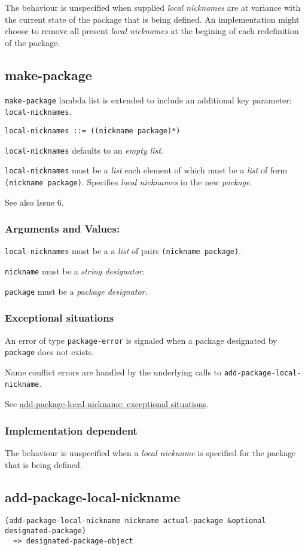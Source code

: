 \documentclass[11pt]{article}
\begin{document}
The behaviour is unspecified when supplied \emph{local nicknames} are at
variance with the current state of the package that is being defined. An
implementation might choose to remove all present \emph{local nicknames} at
the begining of each redefinition of the package.
\subsection{make-package}
\label{sec:org662ac14}
\texttt{make-package} lambda list is extended to include an additional key
parameter: \texttt{local-nicknames}.
\begin{verbatim}
local-nicknames ::= ((nickname package)*)
\end{verbatim}


\texttt{local-nicknames} defaults to an \emph{empty list}.

\texttt{local-nicknames} must be a \emph{list} each element of which must be a \emph{list}
of form \texttt{(nickname package)}. Specifies \emph{local nicknames} in the new
\emph{package}.

See also Issue 6.
\subsubsection{Arguments and Values:}
\label{sec:orga31756a}
\texttt{local-nicknames} must be a a \emph{list} of pairs \texttt{(nickname package)}.

\texttt{nickname} must be a \emph{string designator}.

\texttt{package} must be a \emph{package designator}.
\subsubsection{Exceptional situations}
\label{sec:orgb9d5456}
An error of type \texttt{package-error} is signaled when a package designated by
\texttt{package} does not exists.

Name conflict errors are handled by the underlying calls to
\texttt{add-package-local-nickname}.

See \hyperref[sec:org05d592d]{add-package-local-nickname: exceptional situations}.
\subsubsection{Implementation dependent}
\label{sec:org2faa94f}
The behaviour is unspecified when a \emph{local nickname} is specified for the
package that is being defined.
\subsection{add-package-local-nickname}
\label{sec:org9193f50}
\begin{verbatim}
(add-package-local-nickname nickname actual-package &optional designated-package)
  => designated-package-object
\end{verbatim}
\end{document}
